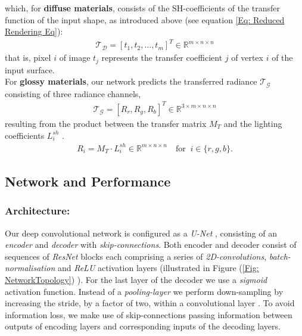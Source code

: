 which, for \textbf{diffuse materials}, consists of the SH-coefficients of the transfer function of the input shape, as introduced above (see equation \ref{Eq: Reduced Rendering Eq}):
\begin{align*}
	\mathcal{T_D} = [ t_1, t_2, \dots, t_m ]^T \in \mathbb{R}^{m \times n \times n} 
\end{align*}
that is, pixel $i$ of image $t_j$ represents the transfer coefficient $j$ of vertex $i$ of the input surface.
\\
For \textbf{glossy materials}, our network predicts the transferred radiance $\mathcal{T_G}$ consisting of three radiance channels, 
\begin{align*}
\mathcal{T_G} = [R_r , R_g ,R_b]^T \in \mathbb{R}^{3 \times m \times n \times n} 
\end{align*}
resulting from the product between the transfer matrix $M_T$ and the lighting coefficients  $ L^{sh}_i$ \cite{sloan2002precomputed}. 
\begin{align*}
R_i= M_T \cdot L^{sh}_i   \in \mathbb{R}^{m \times n \times n}   \quad \text{for }~  i \in \{r,g,b\} .
\end{align*}

\subsection{Network and Performance }
\subsubsection*{Architecture: \\} 
Our deep convolutional network is configured as a \textit{U-Net}  \cite{U-Net}, consisting of an \textit{encoder} and \textit{decoder} with \textit{skip-connections}. Both encoder and decoder consist of sequences of \textit{ResNet} blocks \cite{ResNet} each comprising a series of \textit{2D-convolutions}, \textit{batch-normalisation} and \textit{ReLU} activation layers (illustrated in Figure (\ref{Fig: NetworkTopology}) ). For the last layer of the decoder we use a \textit{sigmoid} activation function. Instead of a \textit{pooling-layer} we perform down-sampling by increasing the stride, by a factor of two, within a convolutional layer \cite{StridingConv}. To avoid information loss,  we make use of skip-connections passing information between outputs of encoding layers and corresponding inputs of the decoding layers.

